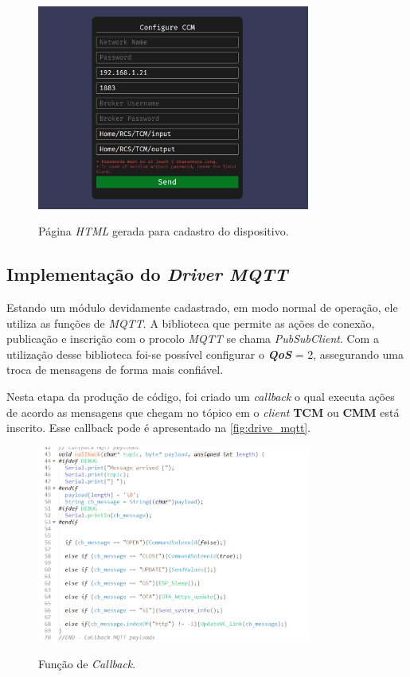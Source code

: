 \begin{figure}[H]
	\centering
	\caption{Página \textit{HTML} gerada para cadastro do dispositivo.}
	\includegraphics[width=0.8\textwidth]{figuras/cadastro_client.png}
	\label{fig:cadastro}
\end{figure}

\subsection {Implementação do \textit{Driver MQTT}}

Estando um módulo devidamente cadastrado, em modo normal de operação, ele utiliza as funções de \textit{MQTT}. A biblioteca que permite as ações de conexão, publicação e inscrição com o procolo \textit{MQTT} se chama \textit{PubSubClient}. Com a utilização desse biblioteca foi-se possível configurar o \textit{\textbf{QoS}} = 2, assegurando uma troca de mensagens de forma mais confiável.

Nesta etapa da produção de código, foi criado um \textit{callback} o qual executa ações de acordo as mensagens que chegam no tópico em o \textit{client} \textbf{TCM} ou \textbf{CMM} está inscrito. Esse callback pode é apresentado na \autoref{fig:drive_mqtt}.

\begin{figure}[H]
	\centering
	\caption{Função de \textit{Callback}.}
	\includegraphics[width=0.8\textwidth]{figuras/drive_mqtt.png}
	\label{fig:drive_mqtt}
\end{figure}

